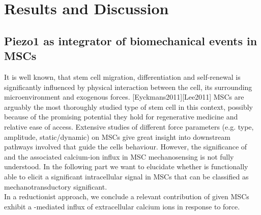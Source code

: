 \chapter{Results and Discussion}

\section{Piezo1 as integrator of biomechanical events in MSCs}
\label{sec:piezo1-as-integrator-of-biomechanical-events-in-mscs}

It is well known, that stem cell migration, differentiation and self-renewal is significantly influenced by physical interaction between the cell, its surrounding microenvironment and exogenous forces. [Eyckmans2011][Lee2011] MSCs are arguably the most thoroughly studied type of stem cell in this context, possibly because of the promising potential they hold for regenerative medicine and relative ease of access. Extensive studies of different force parameters (e.g. type, amplitude, static/dynamic) on MSCs give great insight into downstream pathways involved that guide the cells behaviour. However, the significance of \Piezo{} and the associated calcium-ion influx in MSC mechanosensing is not fully understood. In the following part we want to elucidate whether \Piezo{} is functionally able to elicit a significant intracellular signal in MSCs that can be classified as mechanotransductory significant.\\
In a reductionist approach, we conclude a relevant contribution of \Piezo{} given MSCs exhibit a \Piezo{}-mediated influx of extracellular calcium ions in response to force. \\

